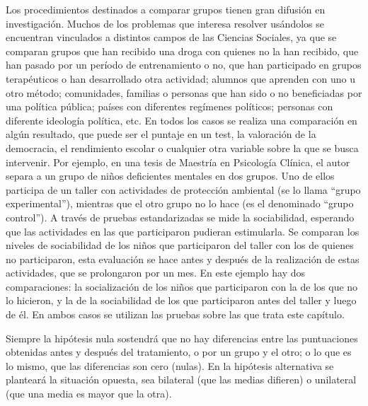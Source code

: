 \documentclass[]{book}
\begin{document}
Los procedimientos destinados a comparar grupos tienen gran difusión en
investigación. Muchos de los problemas que interesa resolver usándolos
se encuentran vinculados a distintos campos de las Ciencias Sociales, ya que se comparan grupos que han recibido una droga con
quienes no la han recibido, que han pasado por un período de
entrenamiento o no, que han participado en grupos terapéuticos o han
desarrollado otra actividad; alumnos que aprenden con uno u otro método; comunidades, familias o personas que han sido o no beneficiadas por una política pública; países con diferentes regímenes políticos; personas con diferente ideología política, etc. En todos los casos se realiza una comparación en algún resultado,
que puede ser el puntaje en un test, la valoración de la democracia, el rendimiento escolar o cualquier otra variable sobre la
que se busca intervenir. Por ejemplo, en una tesis de Maestría en
Psicología Clínica, el autor separa a un grupo de niños deficientes
mentales en dos grupos. Uno de ellos participa de un taller con
actividades de protección ambiental (se lo llama ``grupo experimental''), mientras que
el otro grupo no lo hace (es el denominado ``grupo control''). A través de
pruebas estandarizadas se mide la sociabilidad, esperando que las
actividades en las que participaron pudieran estimularla. Se comparan
los niveles de sociabilidad de los niños que participaron del taller con
los de quienes no participaron, esta evaluación se hace antes y después
de la realización de estas actividades, que se prolongaron por un mes.
En este ejemplo hay dos comparaciones: la socialización de los niños que
participaron con la de los que no lo hicieron, y la de la sociabilidad
de los que participaron antes del taller y luego de él. En ambos casos
se utilizan las pruebas sobre las que trata este capítulo.

Siempre la hipótesis nula sostendrá que no hay diferencias entre las
puntuaciones obtenidas antes y después del tratamiento, o por un grupo y
el otro; o lo que es lo mismo, que las diferencias son cero (nulas). En
la hipótesis alternativa se planteará la situación opuesta, sea
bilateral (que las medias difieren) o unilateral (que una media es mayor que la otra).
\end{document}
